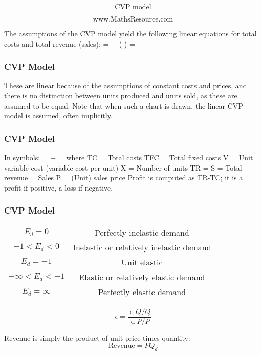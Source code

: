 \documentclass{beamer}
\begin{document}
\begin{frame}
\LARGE

\[   \mbox{CVP model}  \]


\Large
\[   \mbox{www.MathsResource.com}  \]
\end{frame}
\begin{frame}
The assumptions of the CVP model yield the following linear equations for total costs and total revenue (sales):
 =  + ( \times {})
 =  \times {}
\end{frame}

\begin{frame}
\frametitle{CVP Model}
These are linear because of the assumptions of constant costs and prices, and there is no distinction between units produced and units sold, as these are assumed to be equal. Note that when such a chart is drawn, the linear CVP model is assumed, often implicitly.
\end{frame}

\begin{frame}
\frametitle{CVP Model}
In symbols:
 =  +  \times {}
 =  \times {}
where
TC = Total costs
TFC = Total fixed costs
V = Unit variable cost (variable cost per unit)
X = Number of units
TR = S = Total revenue = Sales
P = (Unit) sales price
Profit is computed as TR-TC; it is a profit if positive, a loss if negative.
\end{frame}

\begin{frame}
\frametitle{CVP Model}

\begin{tabular}{|c|c|}
$E_d = 0$ & Perfectly inelastic demand \\
$- 1 < E_d < 0 $ &Inelastic or relatively inelastic demand\\
$E_d=  - 1 $& Unit elastic\\
$ - \infty < E_d < - 1$ & 
Elastic or relatively elastic demand \\
$E_d = \infty $&
Perfectly elastic demand \\
\end{tabular} 
\end{frame}


\begin{frame}
\[ \epsilon = \frac{\operatorname d Q/Q}{\operatorname d P/P} \]



 Revenue is simply the product of unit price times quantity:
  \[﻿ \mbox{Revenue} = PQ_d﻿\]
\end{frame}
\end{document}
